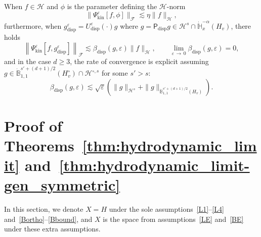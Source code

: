 \documentclass[10pt]{amsart}
\theoremstyle{definition}\newtheorem{defi}[theo]{Definition}\newtheorem{rema}[theo]{Remark}\newtheorem{exam}[theo]{Example}\newtheorem{exem}[theo]{Example}\newtheorem{nota}[theo]{Notation}
\newcommand{\kin}{\mathrm{kin}}
\newcommand{\disp}{\mathrm{disp}}
\newcommand{\bbH}{\mathbb{H}}
\newcommand{\bbB}{\mathbb{B}}
\newcommand{\HH}{\mathcal{H}}
\newcommand{\PP}{\mathsf{P}}
\newcommand{\FFF}{\mathscr{F}}
\newcommand{\HHH}{\mathscr{H}}
\newcommand{\Ss}{H}
\newcommand{\Ssm}{H^{\circ}}
\newcommand{\rSSs}[1]{\HH^{#1}}
\newcommand{\rSSsm}[1]{\HH^{{\circ}, #1}}
\newcommand{\SSSs}{\HHH}
\newcommand{\Sl}{X}
\newcommand{\SSSm}{\FFF}
\renewcommand*\ge{\geqslant}
\newcommand*\eps{{\varepsilon}}
\begin{document}
\begin{prop}\label{prop:special_bilinear_mix}
When $f \in \SSSs$ and $\phi$ is the parameter defining the $\SSSs$-norm
\begin{equation}\label{eq:bilinear_mix_phi}
\| \Psi^\eps_\kin [f, \phi] \|_\SSSm \lesssim \eta \| f \|_\SSSs,
\end{equation}
furthermore, when $g^\eps_\disp = U^\eps_\disp(\cdot) g$ where $g = \PP_{\disp} g \in \rSSs{s} \cap \dot{\bbH}^{-\alpha}_x (\Ss_v)$, there holds
\begin{equation}\label{eq:bilinear_mix_disp}
\left\| \Psi^\eps_\kin \left[f, g^\eps_\disp\right] \right\|_\SSSm \lesssim {\beta_{\disp}}(g, \eps) \| f \|_{ \SSSs }, \qquad \lim_{\eps\,\to\,0} {\beta_{\disp}}(g, \eps)=0,
\end{equation}
and in the case $d \ge 3$, the rate of convergence is explicit assuming $g \in \dot{\bbB}^{s' + (d+1)/2}_{1, 1} (\Ssm_v) \cap \rSSsm{s}$ for some $s'>s$:
\begin{equation*}
{\beta_{\disp}}(g, \eps) \lesssim \sqrt{\eps} \left(\| g \|_{ \rSSs{s} } + \| g \|_{ \dot{\bbB}^{s' + (d+1)/2 }_{1, 1} \left(\Ss_v \right) }\right).
\end{equation*}
\end{prop}


\section{Proof of Theorems~\ref{thm:hydrodynamic_limit} and~\ref{thm:hydrodynamic_limit-gen_symmetric}}
\label{scn:proof_hydrodynamic_limit_symmetrizable}

In this section, we denote $\Sl = \Ss$ under the sole assumptions~\eqref{L1}--\eqref{L4} and~\eqref{Bortho}--\eqref{Bbound}, and $\Sl$ is the space from assumptions~\eqref{LE} and~\eqref{BE} under these extra assumptions.
\end{document}
